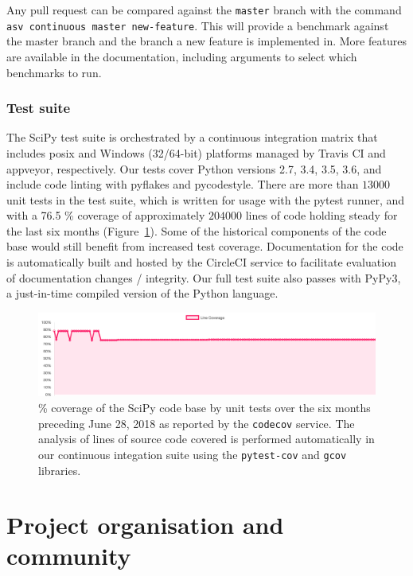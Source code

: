 \documentclass[fleqn,10pt]{wlscirep}
\begin{document}
   Any pull request can be compared against the \texttt{master} branch with the command \texttt{asv continuous master new-feature}. This will provide a benchmark against the master branch and the branch a new feature is implemented in. More features are available in the documentation, including arguments to select which benchmarks to run.

    \subsubsection*{Test suite}
    The SciPy test suite is orchestrated by a continuous integration matrix
    that includes posix and Windows (32/64-bit) platforms managed by Travis CI and appveyor,
    respectively. Our tests cover Python versions 2.7, 3.4, 3.5, 3.6, and include
    code linting with pyflakes and pycodestyle. There are more than $13000$ unit
    tests in the test suite, which is written for usage with the pytest runner, and
    with a 76.5 \% coverage of approximately $204000$ lines
    of code holding steady for the last six months (Figure~\ref{fig:coverage}).
    Some of the historical components of the code base would still benefit from
    increased test coverage. Documentation for the code is automatically built and hosted 
    by the CircleCI service to facilitate evaluation of documentation changes / integrity.
    Our full test suite also passes with PyPy3, a just-in-time compiled version
    of the Python language.

\begin{figure}[H]
\centering
\includegraphics[width=\textwidth]{static/coverage-chart}
\caption{\% coverage of the SciPy code base by unit tests over the six
	 months preceding June 28, 2018 as reported by the \texttt{codecov}
	 service. The analysis of lines of source code covered is performed
	 automatically in our continuous integation suite using the
	 \texttt{pytest-cov} and \texttt{gcov} libraries.}
\label{fig:coverage}
\end{figure}
    




\section*{Project organisation and community}
\end{document}
